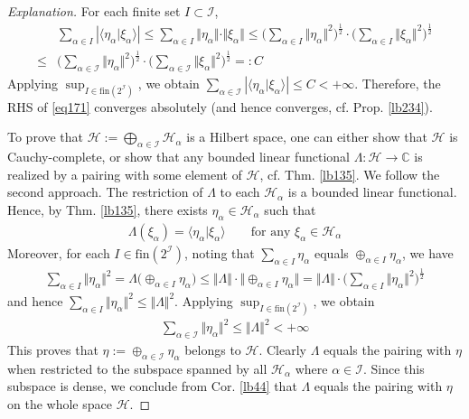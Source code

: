 \documentclass[12pt,b5paper,notitlepage]{article}
\theoremstyle{definition}
\theoremstyle{plain}
\newcommand{\bk}[1]{\langle {#1}\rangle}
\newcommand{\Cbb}{\mathbb C}
\newcommand{\fin}{\mathrm{fin}}
\newcommand{\MH}{\mathcal H}
\newcommand{\SI}{\mathscr I}
\numberwithin{equation}{section}
\begin{document}
\begin{proof}[Explanation]
For each finite set $I\subset\SI$, 
\begin{align*}
&\sum_{\alpha\in I}|\bk{\eta_\alpha|\xi_\alpha}|\leq\sum_{\alpha\in I}\Vert\eta_\alpha\Vert\cdot\Vert\xi_\alpha\Vert\leq\Big(\sum_{\alpha\in I}\Vert\eta_\alpha\Vert^2\Big)^{\frac 12}\cdot \Big(\sum_{\alpha\in I}\Vert\xi_\alpha\Vert^2\Big)^{\frac 12}\\
\leq&\Big(\sum_{\alpha\in\SI}\Vert\eta_\alpha\Vert^2\Big)^{\frac 12}\cdot \Big(\sum_{\alpha\in\SI}\Vert\xi_\alpha\Vert^2\Big)^{\frac 12}=:C
\end{align*}
Applying $\sup_{I\in\fin(2^\SI)}$, we obtain $\sum_{\alpha\in \SI}|\bk{\eta_\alpha|\xi_\alpha}|\leq C<+\infty$. Therefore, the RHS of \eqref{eq171} converges absolutely (and hence converges, cf. Prop. \ref{lb234}).

To prove that $\MH:=\bigoplus_{\alpha\in\SI}\MH_\alpha$ is a Hilbert space, one can either show that $\MH$ is Cauchy-complete, or show that any bounded linear functional $\Lambda:\MH\rightarrow\Cbb$ is realized by a pairing with some element of $\MH$, cf. Thm. \ref{lb135}. We follow the second approach. The restriction of $\Lambda$ to each $\MH_\alpha$ is a bounded linear functional. Hence, by Thm. \ref{lb135}, there exists $\eta_\alpha\in\MH_\alpha$ such that
\begin{align*}
\Lambda(\xi_\alpha)=\bk{\eta_\alpha|\xi_\alpha}\qquad\text{for any }\xi_\alpha\in\MH_\alpha
\end{align*} 
Moreover, for each $I\in\fin(2^\SI)$, noting that $\sum_{\alpha\in I}\eta_\alpha$ equals $\oplus_{\alpha\in I}\eta_\alpha$, we have
\begin{align*}
\sum_{\alpha\in I}\Vert\eta_\alpha\Vert^2=\Lambda\big(\oplus_{\alpha\in I}\eta_\alpha\big)\leq\Vert\Lambda\Vert\cdot \big\Vert\oplus_{\alpha\in I}\eta_\alpha\big\Vert=\Vert\Lambda\Vert\cdot \Big(\sum_{\alpha\in I}\Vert\eta_\alpha\Vert^2\Big)^{\frac 12}
\end{align*}
and hence $\sum_{\alpha\in I}\Vert\eta_\alpha\Vert^2\leq\Vert\Lambda\Vert^2$. Applying $\sup_{I\in\fin(2^\SI)}$, we obtain
\begin{align*}
\sum_{\alpha\in\SI}\Vert\eta_\alpha\Vert^2\leq\Vert\Lambda\Vert^2<+\infty
\end{align*}
This proves that $\eta:=\oplus_{\alpha\in\SI}\eta_\alpha$ belongs to $\MH$. Clearly $\Lambda$ equals the pairing with $\eta$ when restricted to the subspace spanned by all $\MH_\alpha$ where $\alpha\in\SI$. Since this subspace is dense, we conclude from Cor. \ref{lb44} that $\Lambda$ equals the pairing with $\eta$ on the whole space $\MH$.
\end{proof}
\end{document}
